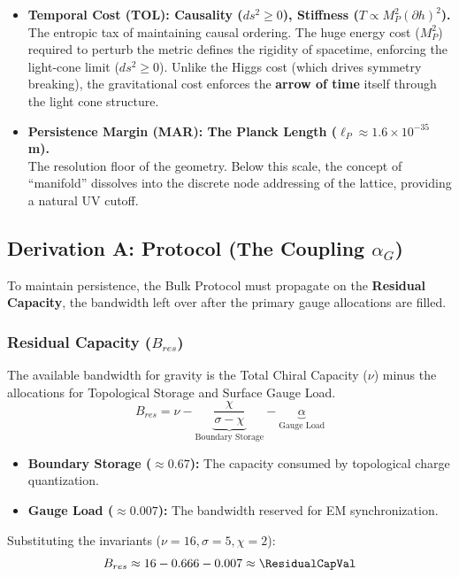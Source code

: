 \begin{itemize}
    \item \textbf{Temporal Cost (TOL): Causality ($ds^2 \ge 0$), Stiffness ($T \propto M_P^2 (\partial h)^2$).} \\
    The entropic tax of maintaining causal ordering. The huge energy cost ($M_P^2$) required to perturb the metric defines the rigidity of spacetime, enforcing the light-cone limit ($ds^2 \ge 0$). Unlike the Higgs cost (which drives symmetry breaking), the gravitational cost enforces the \textbf{arrow of time} itself through the light cone structure.

    \item \textbf{Persistence Margin (MAR): The Planck Length ($\ell_P \approx 1.6 \times 10^{-35}$ m).} \\
    The resolution floor of the geometry. Below this scale, the concept of ``manifold'' dissolves into the discrete node addressing of the lattice, providing a natural UV cutoff.
\end{itemize}


\subsection{Derivation A: Protocol (The Coupling \texorpdfstring{$\alpha_G$}{alphaG})}
To maintain persistence, the Bulk Protocol must propagate on the \textbf{Residual Capacity}, the bandwidth left over after the primary gauge allocations are filled.

\subsubsection{Residual Capacity (\texorpdfstring{$B_{res}$}{Bres})}
The available bandwidth for gravity is the Total Chiral Capacity ($\nu$) minus the allocations for Topological Storage and Surface Gauge Load.
\begin{equation}
B_{res} = \nu - \underbrace{\frac{\chi}{\sigma-\chi}}_{\text{Boundary Storage}} - \underbrace{\alpha}_{\text{Gauge Load}}
\end{equation}
\begin{itemize}
    \item \textbf{Boundary Storage ($\approx 0.67$):} The capacity consumed by topological charge quantization.
    \item \textbf{Gauge Load ($\approx 0.007$):} The bandwidth reserved for EM synchronization.
\end{itemize}
Substituting the invariants ($\nu=16, \sigma=5, \chi=2$):
\begin{equation}
B_{res} \approx 16 - 0.666 - 0.007 \approx \mathbf{\ResidualCapVal}
\end{equation}

